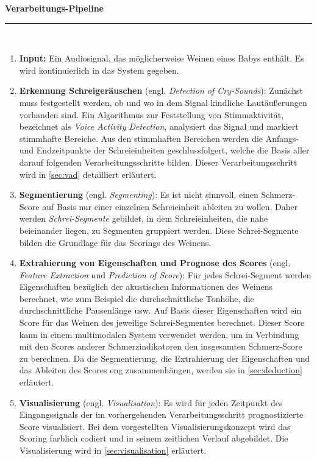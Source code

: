 \noindent\textbf{Verarbeitungs-Pipeline}\noindent\rule{0.7\linewidth}{0.3pt} \\[-3mm]
\begin{enumerate}[leftmargin=*]
	\item \textbf{Input: } Ein Audiosignal, das möglicherweise Weinen eines Babys enthält. Es wird kontinuierlich in das System gegeben.
	
	\item \textbf{Erkennung Schreigeräuschen} (engl. \emph{Detection of Cry-Sounds}): Zunächst muss festgestellt werden, ob und wo in dem Signal kindliche Lautäußerungen vorhanden sind. Ein Algorithmus zur Feststellung von Stimmaktivität, bezeichnet als \emph{Voice Activity Detection}, analysiert das Signal und markiert stimmhafte Bereiche. Aus den stimmhaften Bereichen werden die Anfangs- und Endzeitpunkte der Schreieinheiten geschlussfolgert, welche die Basis aller darauf folgenden Verarbeitungsschritte bilden. Dieser Verarbeitungsschritt wird in \autoref{sec:vad} detailliert erläutert.
	
	\item \textbf{Segmentierung} (engl. \emph{Segmenting}): Es ist nicht sinnvoll, einen Schmerz-Score auf Basis nur einer einzelnen Schreieinheit ableiten zu wollen. Daher werden \emph{Schrei-Segmente} gebildet, in dem Schreieinheiten, die nahe beieinander liegen, zu Segmenten gruppiert werden. Diese Schrei-Segmente bilden die Grundlage für das Scorings des Weinens. 
		
	\item \textbf{Extrahierung von Eigenschaften und Prognose des Scores} (engl. \emph{Feature Extraction} und \emph{Prediction of Score}): Für jedes Schrei-Segment werden Eigenschaften bezüglich der akustischen Informationen des Weinens berechnet, wie zum Beispiel die durchschnittliche Tonhöhe, die durchschnittliche Pausenlänge usw. Auf Basis dieser Eigenschaften wird ein Score für das Weinen des jeweilige Schrei-Segmentes berechnet. Dieser Score kann in einem multimodalen System verwendet werden, um in Verbindung mit den Scores anderer Schmerzindikatoren den insgesamten Schmerz-Score zu berechnen. Da die Segmentierung, die Extrahierung der Eigenschaften und das Ableiten des Scores eng zusammenhängen, werden sie in \autoref{sec:deduction} erläutert.
	
	\item \textbf{Visualisierung} (engl. \emph{Visualisation}): Es wird für jeden Zeitpunkt des Eingangssignals der im vorhergehenden Verarbeitungsschritt prognostizierte Score visualisiert. Bei dem vorgestellten Visualisierungskonzept wird das Scoring farblich codiert und in seinem zeitlichen Verlauf abgebildet. Die Visualisierung wird in \autoref{sec:visualisation} erläutert.	
	\end{enumerate}
	
